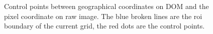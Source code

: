 \begin{figure}[htb!]
  \begin{center}
  \end{center}
  \caption[Control points between geographical coordinates on DOM and the pixel coordinate on raw image]{
    Control points between geographical coordinates on DOM and the pixel coordinate on raw image. The blue broken lines are the \gls{roi} boundary of the current grid, the red dots are the control points.
  }
  \label{fig:xrs2}
\end{figure}